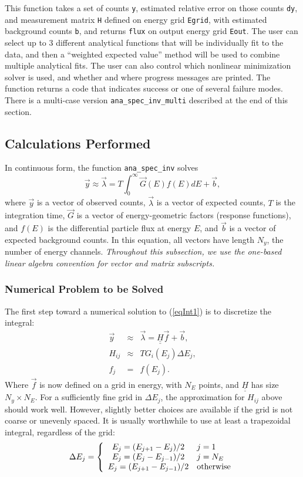 \documentclass{article}    %
\newcommand{\dbul}[1]{\underline{\underline{#1}}}
\begin{document}
This function takes a set of counts \verb|y|, estimated relative error
on those counts \verb|dy|, and measurement matrix \verb|H| defined on
energy grid \verb|Egrid|, with estimated background counts \verb|b|,
and returns \verb|flux| on output energy grid \verb|Eout|. The user
can select up to 3 different analytical functions that will be
individually fit to the data, and then a ``weighted expected value''
method will be used to combine multiple analytical fits. The user can
also control which nonlinear minimization solver is used, and whether
and where progress messages are printed. The function returns a code
that indicates success or one of several failure modes. There is a
multi-case version \verb|ana_spec_inv_multi| described at the end of
this section.

\subsection{Calculations Performed}

In continuous form, the function \verb|ana_spec_inv| solves
\begin{equation}
\vec{y} \approx \vec{\lambda} = T\int_0^{\infty} \vec{G}(E)f(E)dE + \vec{b}, \label{eqInt1}
\end{equation}
where $\vec{y}$ is a vector of observed counts, $\vec{\lambda}$ is a
vector of expected counts, $T$ is the integration time, $\vec{G}$ is a
vector of energy-geometric factors (response functions), and $f(E)$ is
the differential particle flux at energy $E$, and $\vec{b}$ is a
vector of expected background counts. In this equation, all vectors
have length $N_y$, the number of energy channels. {\it Throughout this
  subsection, we use the one-based linear algebra convention for
  vector and matrix subscripts.}

\subsubsection{Numerical Problem to be Solved}

The first step toward a numerical solution to (\ref{eqInt1}) is to discretize the integral:
\begin{eqnarray}
\vec{y} &\approx& \vec{\lambda} = \dbul{H}\vec{f} + \vec{b}, \\
H_{ij} &\approx& T G_i(E_j) \Delta E_j, \\
f_j &=& f(E_j).
\end{eqnarray}
Where $\vec{f}$ is now defined on a grid in energy, with $N_E$ points,
and $\dbul{H}$ has size $N_y \times N_E$. For a sufficiently fine grid
in $\Delta E_j$, the approximation for $H_{ij}$ above should work
well. However, slightly better choices are available if the grid
is not coarse or unevenly spaced. It is usually worthwhile to use
at least a trapezoidal integral, regardless of the grid:
\begin{equation}
  \Delta E_j = \left\{
\begin{array}{cl}
E_j = (E_{j+1}-E_j)/2 & j=1 \\
E_j = (E_{j}-E_{j-1})/2 & j=N_E \\
E_j = (E_{j+1}-E_{j-1})/2 & {\rm otherwise}
\end{array}
\right.
\end{equation}
\end{document}
